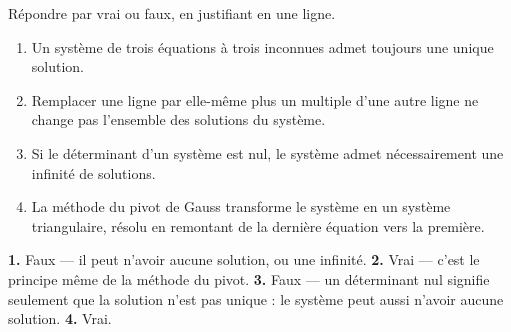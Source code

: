 \begin{jemeteste}
Répondre par vrai ou faux, en justifiant en une ligne.

\begin{enumerate}[label=\textbf{\arabic*.}, leftmargin=*, itemsep=0.28em]
  \item Un système de trois équations à trois inconnues admet toujours une
        unique solution.
  \item Remplacer une ligne par elle-même plus un multiple d'une autre ligne
        ne change pas l'ensemble des solutions du système.
  \item Si le déterminant d'un système est nul, le système admet
        nécessairement une infinité de solutions.
  \item La méthode du pivot de Gauss transforme le système en un système
        triangulaire, résolu en remontant de la dernière équation vers la
        première.
\end{enumerate}
\end{jemeteste}

\begin{corrige}[je me teste]
\textbf{1.} Faux — il peut n'avoir aucune solution, ou une infinité.
\textbf{2.} Vrai — c'est le principe même de la méthode du pivot.
\textbf{3.} Faux — un déterminant nul signifie seulement que la solution
n'est pas unique : le système peut aussi n'avoir aucune solution.
\textbf{4.} Vrai.
\end{corrige}


